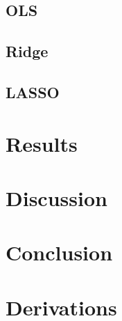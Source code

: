 \documentclass[%
reprint,
amsmath,amssymb,
aps,
pra,
]{revtex4-2}
\begin{document}
\subsection{OLS}

\subsection{Ridge}

\subsection{LASSO}

\section{Results}

\section{Discussion}

\section{Conclusion}




\appendix
\section{Derivations}
\label{Appendix:Derivations}
\end{document}
